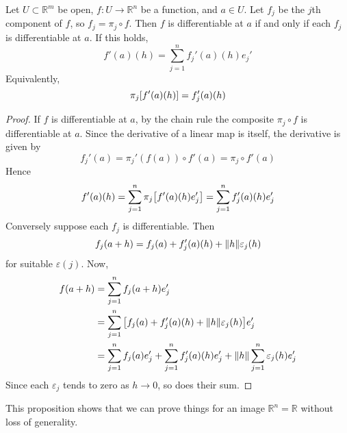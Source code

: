 \begin{proposition}
	Let \( U \subset \mathbb R^m \) be open, \( f \colon U \to \mathbb R^n \) be a function, and \( a \in U \).
	Let \( f_j \) be the \( j \)th component of \( f \), so \( f_j = \pi_j \circ f \).
	Then \( f \) is differentiable at \( a \) if and only if each \( f_j \) is differentiable at \( a \).
	If this holds,
	\[
		f'(a)(h) = \sum_{j=1}^n f_j'(a)(h) e_j'
	\]
	Equivalently,
	\[
		\pi_j \qty[ f'(a)(h) ] = f_j'(a)(h)
	\]
\end{proposition}
\begin{proof}
	If \( f \) is differentiable at \( a \), by the chain rule the composite \( \pi_j \circ f \) is differentiable at \( a \).
	Since the derivative of a linear map is itself, the derivative is given by
	\[
		f_j'(a) = \pi_j'(f(a)) \circ f'(a) = \pi_j \circ f'(a)
	\]
	Hence
	\[
		f'(a)(h) = \sum_{j=1}^n \pi_j\qty[ f'(a)(h) e_j' ] = \sum_{j=1}^n f_j'(a)(h) e_j'
	\]
	Conversely suppose each \( f_j \) is differentiable.
	Then
	\[
		f_j(a+h) = f_j(a) + f_j'(a)(h) + \norm{h} \varepsilon_j(h)
	\]
	for suitable \( \varepsilon(j) \).
	Now,
	\begin{align*}
		f(a+h) & = \sum_{j=1}^n f_j(a+h)e_j'                                                                             \\
		       & = \sum_{j=1}^n \qty[f_j(a) + f_j'(a)(h) + \norm{h} \varepsilon_j(h)] e_j'                               \\
		       & = \sum_{j=1}^n f_j(a) e_j' + \sum_{j=1}^n f_j'(a)(h) e_j' + \norm{h} \sum_{j=1}^n \varepsilon_j(h) e_j'
	\end{align*}
	Since each \( \varepsilon_j \) tends to zero as \( h \to 0 \), so does their sum.
\end{proof}
\begin{remark}
	This proposition shows that we can prove things for an image \( \mathbb R^n = \mathbb R \) without loss of generality.
\end{remark}

